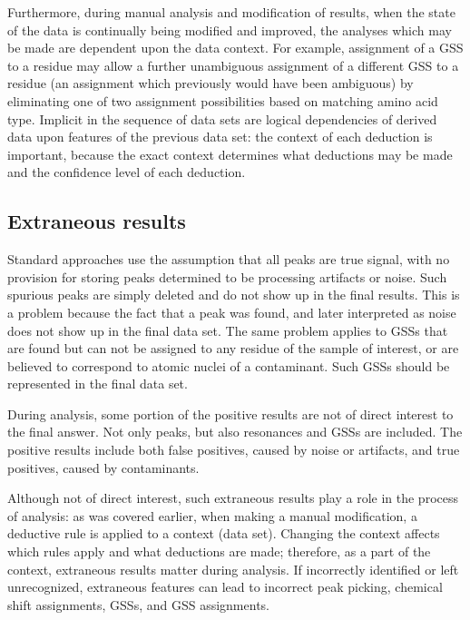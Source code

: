 Furthermore, during manual analysis and modification of results, when the 
state of the data is continually being modified and improved, the analyses
which may be made are dependent upon the data context.
For example, assignment of a GSS to a residue may allow a further 
unambiguous assignment of a different GSS to a residue (an assignment 
which previously would have been ambiguous) by eliminating one of two 
assignment possibilities based on matching amino acid type.
Implicit in the sequence of data sets are logical dependencies of derived
data upon features of the previous data set: the context of each deduction
is important, because the exact context determines what deductions may be
made and the confidence level of each deduction. 



\subsection*{Extraneous results}
Standard approaches use the 
assumption that all peaks are true signal, with no provision for storing peaks 
determined to be processing artifacts or noise.  Such spurious peaks are simply 
deleted and do not show up in the final results.  This is a problem because the 
fact that a peak was found, and later interpreted as noise does not show up in 
the final data set.  The same problem applies to GSSs that are found 
but can not be assigned to any residue of the sample of interest, or are 
believed to correspond to atomic nuclei of a contaminant.  Such GSSs should 
be represented in the final data set.

During analysis, some portion of the positive results are not of direct interest
to the final answer.  Not only peaks, but also resonances and GSSs are included.
The positive results include both false positives, caused by noise or
artifacts, and true positives, caused by contaminants.

Although not of direct interest, such extraneous results play a role in 
the process of analysis: as was covered earlier, when making a manual
modification, a deductive rule is applied to a context (data set).  Changing 
the context affects which rules apply and what deductions are made; 
therefore, as a part of the context, extraneous results matter during analysis. 
If incorrectly identified or left unrecognized, extraneous features can
lead to incorrect peak picking, chemical shift assignments, GSSs, and GSS
assignments.

